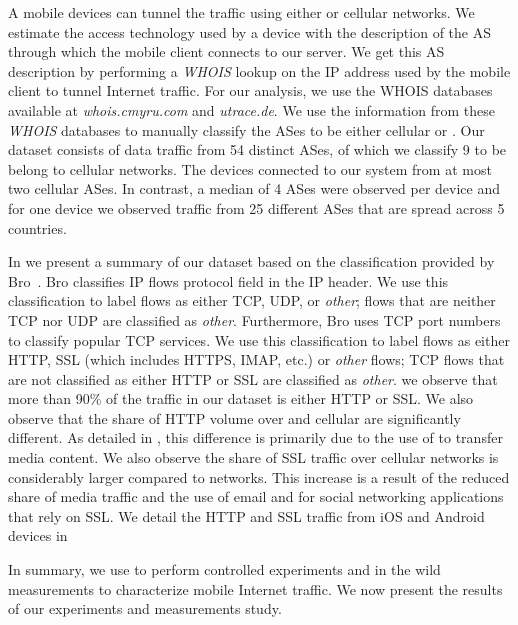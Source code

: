 A mobile devices can tunnel the traffic using either \wifi or cellular networks. 
We estimate the access technology used by a device with the description of the AS through which the mobile client connects to our \platname server. 
We get this AS description by performing a \emph{WHOIS} lookup on the IP address used by the mobile client to tunnel Internet traffic. 
For our analysis, we use the WHOIS databases available at \emph{whois.cmyru.com} and \emph{utrace.de}.
We use the information from these \emph{WHOIS} databases to manually classify the ASes to be either cellular or \wifi.
Our dataset consists of data traffic from 54 distinct ASes, of which we classify 9 to be belong to cellular networks.
The devices connected to our system from at most two cellular ASes.
In contrast, a median of 4 \wifi ASes were observed per device and for one device we observed traffic from 25 different \wifi ASes that are spread across 5 countries. 

In  we present a summary of our dataset based on the classification provided by Bro~\cite{bro}.
Bro classifies IP flows protocol field in the IP header. 
We use this classification to label flows as either TCP, UDP, or \emph{other}; flows that are neither TCP nor UDP are classified as \emph{other}. 
Furthermore, Bro uses TCP port numbers to classify popular TCP services.
We use this classification to label flows as either HTTP, SSL (which includes HTTPS, IMAP, etc.) or \emph{other} flows; TCP flows that are not classified as either HTTP or SSL are classified as \emph{other}.
we observe that more than 90\% of the traffic in our dataset is either HTTP or SSL. 
We also observe that the share of HTTP volume over \wifi and cellular are significantly different. 
As detailed in , this difference is primarily due to the use of \wifi to transfer media content.
We also observe the share of SSL traffic over cellular networks is considerably larger compared to \wifi networks.
This increase is a result of the reduced share of media traffic and the use of email and for social networking applications that rely on SSL.
We detail the HTTP and SSL traffic from iOS and Android devices in 

In summary, we use \platname to perform controlled experiments and in the wild measurements to characterize mobile Internet traffic. 
We now present the results of our experiments and measurements study. 



